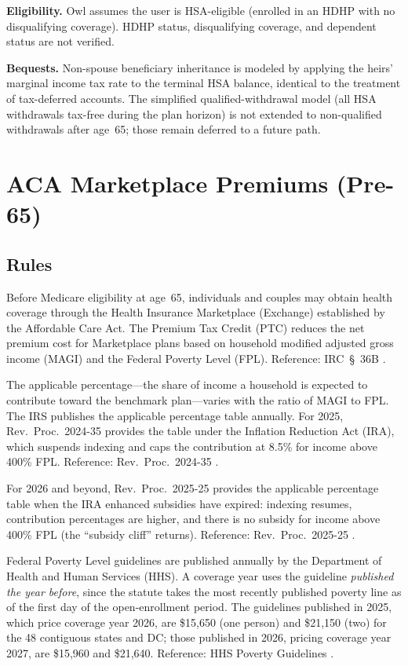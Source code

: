 \documentclass[fleqn,12pt]{report}
\begin{document}
\textbf{Eligibility.}
Owl assumes the user is HSA-eligible (enrolled in an HDHP with no
disqualifying coverage).
HDHP status, disqualifying coverage, and dependent status are not verified.

\textbf{Bequests.}
Non-spouse beneficiary inheritance is modeled by applying the heirs'
marginal income tax rate to the terminal HSA balance, identical to the
treatment of tax-deferred accounts.
The simplified qualified-withdrawal model (all HSA withdrawals tax-free
during the plan horizon) is not extended to non-qualified withdrawals after
age~65; those remain deferred to a future path.

\section{ACA Marketplace Premiums (Pre-65)}
\label{sec:aca}

\subsection*{Rules}

Before Medicare eligibility at age~65, individuals and couples may obtain health
coverage through the Health Insurance Marketplace (Exchange) established by the
Affordable Care Act.
The Premium Tax Credit (PTC) reduces the net premium cost for Marketplace plans
based on household modified adjusted gross income (MAGI) and the Federal Poverty
Level (FPL).
Reference: IRC~\S~36B \cite{irc36b}.

The applicable percentage---the share of income a household is expected to contribute
toward the benchmark plan---varies with the ratio of MAGI to FPL.
The IRS publishes the applicable percentage table annually.
For 2025, Rev.\ Proc.\ 2024-35 provides the table under the Inflation Reduction Act
(IRA), which suspends indexing and caps the contribution at 8.5\% for income above
400\% FPL.
Reference: Rev.\ Proc.\ 2024-35 \cite{revproc2024_35}.

For 2026 and beyond, Rev.\ Proc.\ 2025-25 provides the applicable percentage table
when the IRA enhanced subsidies have expired: indexing resumes, contribution
percentages are higher, and there is no subsidy for income above 400\% FPL (the
``subsidy cliff'' returns).
Reference: Rev.\ Proc.\ 2025-25 \cite{revproc2025_25}.

Federal Poverty Level guidelines are published annually by the Department of Health
and Human Services (HHS).
A coverage year uses the guideline \emph{published the year before}, since the statute
takes the most recently published poverty line as of the first day of the open-enrollment
period.  The guidelines published in 2025, which price coverage year 2026, are \$15,650
(one person) and \$21,150 (two) for the 48 contiguous states and DC; those published in
2026, pricing coverage year 2027, are \$15,960 and \$21,640.
Reference: HHS Poverty Guidelines \cite{hhspoverty}.
\end{document}
